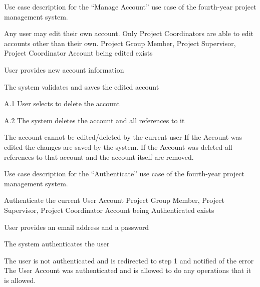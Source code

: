\begin{table}
  \centering
  \caption{Use case description for the ``Manage Account'' use case of the fourth-year project management system.}
  \label{tbl:use-case-manage-account}

  \begin{usecase}
    Any user may edit their own account. Only Project Coordinators are able to edit accounts other than their own.
    Project Group Member, Project Supervisor, Project Coordinator
    Account being edited exists
    \ucnormal
    \begin{ucenum}
      \item User provides new account information
      \item The system validates and saves the edited account
    \end{ucenum}
    \begin{ucenum}
      \item [A.1] User selects to delete the account
      \item [A.2] The system deletes the account and all references to it
    \end{ucenum}
    The account cannot be edited\slash deleted by the current user
    If the Account was edited the changes are saved by the system. If the Account was deleted all references to that account and the account itself are removed.
  \end{usecase}
\end{table}


\begin{table}
  \centering
  \caption{Use case description for the ``Authenticate'' use case of the fourth-year project management system.}
  \label{tbl:use-case-authenticate}

  \begin{usecase}[Authenticate]
    Authenticate the current User Account
    Project Group Member, Project Supervisor, Project Coordinator
    Account being Authenticated exists
    \ucnormal
    \begin{ucenum}
      \item User provides an email address and a password
      \item The system authenticates the user
    \end{ucenum}
    The user is not authenticated and is redirected to step 1 and notified of the error
    The User Account was authenticated and is allowed to do any operations that it is allowed.
  \end{usecase}
\end{table}


